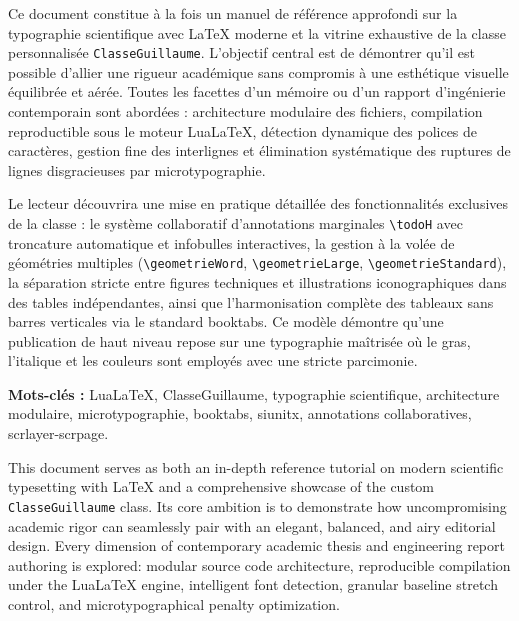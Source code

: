 
Ce document constitue à la fois un manuel de référence approfondi sur la typographie scientifique avec \LaTeX{} moderne et la vitrine exhaustive de la classe personnalisée \texttt{ClasseGuillaume}.
L'objectif central est de démontrer qu'il est possible d'allier une rigueur académique sans compromis à une esthétique visuelle équilibrée et aérée.
Toutes les facettes d'un mémoire ou d'un rapport d'ingénierie contemporain sont abordées : architecture modulaire des fichiers, compilation reproductible sous le moteur Lua\LaTeX{}, détection dynamique des polices de caractères, gestion fine des interlignes et élimination systématique des ruptures de lignes disgracieuses par microtypographie.

Le lecteur découvrira une mise en pratique détaillée des fonctionnalités exclusives de la classe :
le système collaboratif d'annotations marginales \texttt{\textbackslash todoH} avec troncature automatique et infobulles interactives, la gestion à la volée de géométries multiples (\texttt{\textbackslash geometrieWord}, \texttt{\textbackslash geometrieLarge}, \texttt{\textbackslash geometrieStandard}), la séparation stricte entre figures techniques et illustrations iconographiques dans des tables indépendantes, ainsi que l'harmonisation complète des tableaux sans barres verticales via le standard \textsf{booktabs}.
Ce modèle démontre qu'une publication de haut niveau repose sur une typographie maîtrisée où le gras, l'italique et les couleurs sont employés avec une stricte parcimonie.

\bigskip
\noindent\textbf{Mots-clés :} Lua\LaTeX{}, ClasseGuillaume, typographie scientifique, architecture modulaire, microtypographie, booktabs, siunitx, annotations collaboratives, scrlayer-scrpage.

\bigskip
\bigskip


This document serves as both an in-depth reference tutorial on modern scientific typesetting with \LaTeX{} and a comprehensive showcase of the custom \texttt{ClasseGuillaume} class.
Its core ambition is to demonstrate how uncompromising academic rigor can seamlessly pair with an elegant, balanced, and airy editorial design.
Every dimension of contemporary academic thesis and engineering report authoring is explored: modular source code architecture, reproducible compilation under the Lua\LaTeX{} engine, intelligent font detection, granular baseline stretch control, and microtypographical penalty optimization.

